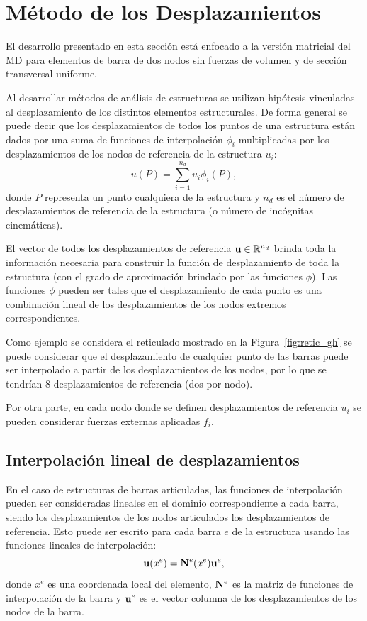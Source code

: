 \section{Método de los Desplazamientos}

El desarrollo presentado en esta sección está enfocado a la versión matricial del MD para elementos de barra de dos nodos sin fuerzas de volumen y de sección transversal uniforme. %
%

Al desarrollar métodos de análisis de estructuras se utilizan hipótesis vinculadas al desplazamiento de los distintos elementos estructurales. %
De forma general se puede decir que los desplazamientos de todos los puntos de una estructura están dados por una suma de funciones de interpolación $\phi_i$ multiplicadas por los desplazamientos de los nodos de referencia de la estructura $u_i$:
%
\begin{equation}
u(P) = \sum_{i=1}^{n_d} u_i \phi_i(P),
\end{equation}
%
donde $P$ representa un punto cualquiera de la estructura y $n_d$ es el número de desplazamientos de referencia de la estructura (o número de incógnitas cinemáticas). %


El vector de todos los desplazamientos de referencia ${\bf u} \in {\mathbb R}^{n_d}$ brinda toda la información necesaria para construir la función de desplazamiento de toda la estructura (con el grado de aproximación brindado por las funciones $\phi$). %
%
Las funciones $\phi$ pueden ser tales que el desplazamiento de cada punto es una combinación lineal de los desplazamientos de los nodos extremos correspondientes.

Como ejemplo se considera el reticulado mostrado en la Figura~\ref{fig:retic_gh} se puede considerar que el desplazamiento de cualquier punto de las barras puede ser interpolado a partir de los desplazamientos de los nodos, por lo que se tendrían $8$ desplazamientos de referencia (dos por nodo).

Por otra parte, en cada nodo donde se definen desplazamientos de referencia $u_i$ se pueden considerar fuerzas externas aplicadas $f_i$.

\subsection{Interpolación lineal de desplazamientos}

En el caso de estructuras de barras articuladas, las funciones de interpolación pueden ser consideradas lineales en el dominio correspondiente a cada barra, siendo los desplazamientos de los nodos articulados los desplazamientos de referencia. %
%
Esto puede ser escrito para cada barra $e$ de la estructura usando las funciones lineales de interpolación:
%
\begin{equation}
{\bf u} (x^e) = {\bf N}^e(x^e) {\bf u}^e,
\end{equation}
%
donde $x^e$ es una coordenada local del elemento, ${\bf N}^e$ es la matriz de funciones de interpolación de la barra y ${\bf u}^e$ es el vector columna de los desplazamientos de los nodos de la barra. %
%


